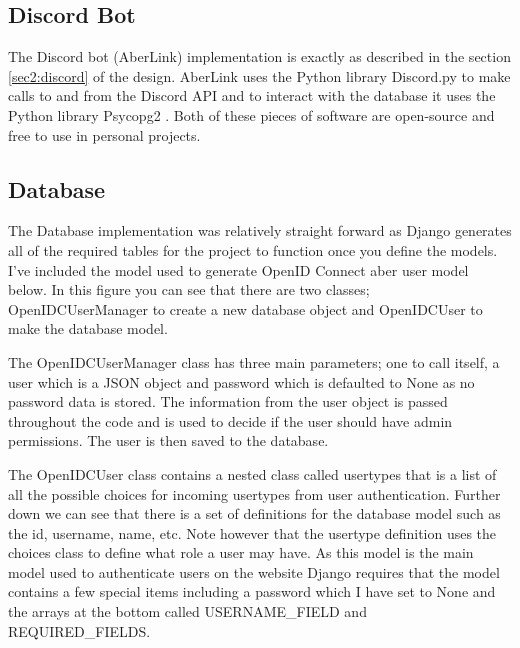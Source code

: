 \subsection{Discord Bot}
The Discord bot (AberLink) implementation is exactly as described in the section \ref{sec2:discord} of the design. AberLink uses the Python library Discord.py \cite{discord.py} to make calls to and from the Discord API and to interact with the database it uses the Python library Psycopg2 \cite{psycopg2}. Both of these pieces of software are open-source and free to use in personal projects. 

\subsection{Database}
The Database implementation was relatively straight forward as Django \cite{Django} generates all of the required tables for the project to function once you define the models. I've included the model used to generate OpenID Connect \cite{OpenID} aber user model below. In this figure you can see that there are two classes; OpenIDCUserManager to create a new database object and OpenIDCUser to make the database model. 

The OpenIDCUserManager class has three main parameters; one to call itself, a user which is a JSON object and password which is defaulted to None as no password data is stored. The information from the user object is passed throughout the code and is used to decide if the user should have admin permissions. The user is then saved to the database.

The OpenIDCUser class contains a nested class called usertypes that is a list of all the possible choices for incoming usertypes from user authentication. Further down we can see that there is a set of definitions for the database model such as the id, username, name, etc. Note however that the usertype definition uses the choices class to define what role a user may have. As this model is the main model used to authenticate users on the website Django requires that the model contains a few special items including a password which I have set to None and the arrays at the bottom called USERNAME\_FIELD and REQUIRED\_FIELDS.

